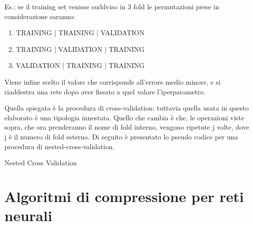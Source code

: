 \documentclass[12pt]{report}
\begin{document}
\newpage
Es.: se il training set venisse suddviso in 3 fold le permutazioni prese in considerazione saranno:
\begin{enumerate}
\item{TRAINING | TRAINING | VALIDATION}
\item{TRAINING | VALIDATION | TRAINING}
\item{VALIDATION | TRAINING | TRAINING}
\end{enumerate}

Viene infine scelto il valore che corrisponde all'errore medio minore, e si riaddestra una rete dopo aver fissato a quel valore l'iperparametro.

Quella spiegata è la procedura di cross-validation: tuttavia quella usata in questo elaborato è una tipologia innestata. Quello che cambia è che, le operazioni viste sopra, che ora prenderanno il nome di fold interno, vengono ripetute j volte, dove j è il numero di fold esterno. Di seguito è presentato lo pseudo codice per una procedura di nested-cross-validation.

\makeatletter
\def\BState{\State\hskip-\ALG@thistlm}
\makeatother

\begin{algorithm}
\caption{Nested Cross Validation}
\end{algorithm}

\chapter{Algoritmi di compressione per reti neurali}
\end{document}
